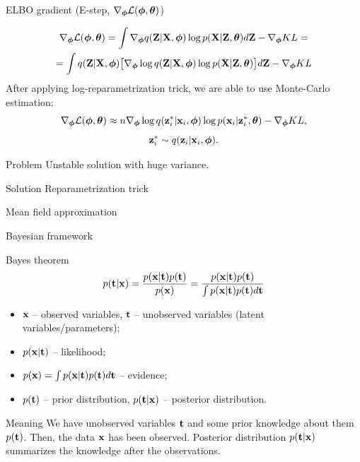 \begin{frame}{ELBO gradient (E-step, $\nabla_{\boldsymbol{\phi}} \mathcal{L}(\boldsymbol{\phi}, \boldsymbol{\theta})$)}

	\begin{multline*}
		\nabla_{\boldsymbol{\phi}} \mathcal{L} (\boldsymbol{\phi}, \boldsymbol{\theta}) = \int \nabla_{\boldsymbol{\phi}} q(\mathbf{Z}| \mathbf{X}, \boldsymbol{\phi}) \log p(\mathbf{X} |\mathbf{Z}, \boldsymbol{\theta}) d\mathbf{Z}  - \nabla_{\boldsymbol{\phi}} KL = \\ 
		=  \int q(\mathbf{Z}| \mathbf{X}, \boldsymbol{\phi}) \bigl[  \nabla_{\boldsymbol{\phi}} \log q(\mathbf{Z}| \mathbf{X}, \boldsymbol{\phi}) \log p(\mathbf{X} |\mathbf{Z}, \boldsymbol{\theta}) \bigr] d\mathbf{Z} - \nabla_{\boldsymbol{\phi}} KL
	\end{multline*}
	After applying log-reparametrization trick, we are able to use Monte-Carlo estimation:
	\[
		\nabla_{\boldsymbol{\phi}} \mathcal{L} (\boldsymbol{\phi}, \boldsymbol{\theta}) \approx n \nabla_{\boldsymbol{\phi}} \log q(\mathbf{z}_i^*| \mathbf{x}_i, \boldsymbol{\phi}) \log p(\mathbf{x}_i |\mathbf{z}_i^*, \boldsymbol{\theta}) - \nabla_{\boldsymbol{\phi}} KL,
	\]
	\[
		\mathbf{z}_i^* \sim q(\mathbf{z}_i| \mathbf{x}_i, \boldsymbol{\phi}).
	\]
	\vspace{-0.2cm}
	\begin{block}{Problem} 
	Unstable solution with huge variance.
	\end{block}
	\begin{block}{Solution}
	    Reparametrization trick
	\end{block}
\end{frame}
\begin{frame}{Mean field approximation}
\end{frame}
\begin{frame}{Bayesian framework}
	\begin{block}{Bayes theorem}
		\[
			p(\mathbf{t} | \mathbf{x}) = \frac{p(\mathbf{x} | \mathbf{t}) p(\mathbf{t})}{p(\mathbf{x})} = \frac{p(\mathbf{x} | \mathbf{t}) p(\mathbf{t})}{\int p(\mathbf{x} | \mathbf{t}) p(\mathbf{t}) d \mathbf{t}} 
		\]
		\begin{itemize}
			\item $\mathbf{x}$ -- observed variables, $\mathbf{t}$ -- unobserved variables (latent variables/parameters);
			\item $p(\mathbf{x} | \mathbf{t})$ -- likelihood;
			\item $p(\mathbf{x}) = \int p(\mathbf{x} | \mathbf{t}) p(\mathbf{t}) d \mathbf{t}$ -- evidence;
			\item $p(\mathbf{t})$ -- prior distribution, $p(\mathbf{t} | \mathbf{x})$ -- posterior distribution.
		\end{itemize}
	\end{block}
	\begin{block}{Meaning}
		We have unobserved variables $\mathbf{t}$ and some prior knowledge about them $p(\mathbf{t})$. Then, the data $\mathbf{x}$ has been observed. 
		Posterior distribution $p(\mathbf{t} | \mathbf{x})$ summarizes the knowledge after the observations.
	\end{block}
\end{frame}
